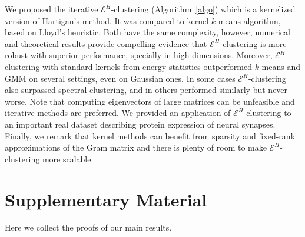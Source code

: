 \documentclass{article}
\begin{document}
We proposed the iterative $\mathcal{E}^H$-clustering 
(Algorithm~\ref{algo})
which is 
a kernelized version of Hartigan's method. 
It was compared to kernel $k$-means algorithm,
based on Lloyd's heuristic.
Both have the same complexity, however, numerical and theoretical
results provide compelling evidence that $\mathcal{E}^H$-clustering
is more robust with superior performance, specially in high
dimensions. 
Moreover, $\mathcal{E}^H$-clustering with standard kernels from energy
statistics outperformed $k$-means and GMM
on several settings, even on Gaussian ones.
In some cases
$\mathcal{E}^H$-clustering also surpassed spectral clustering, and in
others performed similarly but never worse. 
Note that computing eigenvectors
of large matrices can be unfeasible and iterative methods are preferred.
We provided an application of $\mathcal{E}^H$-clustering to an
important real dataset
describing protein expression of neural synapses.
Finally, we remark that kernel methods can benefit from sparsity and
fixed-rank approximations of the Gram matrix and there is plenty
of room to make $\mathcal{E}^H$-clustering more scalable.







\clearpage

\appendix

\section{Supplementary Material}

Here we collect the proofs of our main results.
\end{document}
